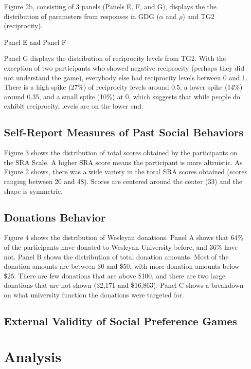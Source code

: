 \documentclass[12pt]{article}
\begin{document}
Figure 2b, consisting of 3 panels (Panels E, F, and G), displays the the distribution of parameters from responses in GDG (\(\alpha\) and \(\rho\)) and TG2 (reciprocity).

{\color{red} Panel E and Panel F}

Panel G displays the distribution of reciprocity levels from TG2. With the exception of two participants who showed negative reciprocity (perhaps they did not understand the game), everybody else had reciprocity levels between 0 and 1. There is a high spike (27\%) of reciprocity levels around 0.5, a lower spike (14\%) around 0.35, and a small spike (10\%) at 0, which suggests that while people do exhibit reciprocity, levels are on the lower end.


\subsection{Self-Report Measures of Past Social Behaviors}

Figure 3 shows the distribution of total scores obtained by the participants on the SRA Scale. A higher SRA score means the participant is more altruistic. As Figure 2 shows, there was a wide variety in the total SRA scores obtained (scores ranging between 20 and 48). Scores are centered around the center (33) and the shape is symmetric.

\subsection{Donations Behavior}

Figure 4 shows the distribution of Wesleyan donations. Panel A shows that 64\% of the participants have donated to Wesleyan University before, and 36\% have not. Panel B shows the distribution of total donation amounts. Most of the donation amounts are between \$0 and \$50, with more donation amounts below \$25. There are few donations that are above \$100, and there are two large donations that are not shown (\$2,171 and \$16,863). Panel C shows a breakdown on what university function the donations were targeted for.

\subsection{External Validity of Social Preference Games}




\section{Analysis}
\end{document}
